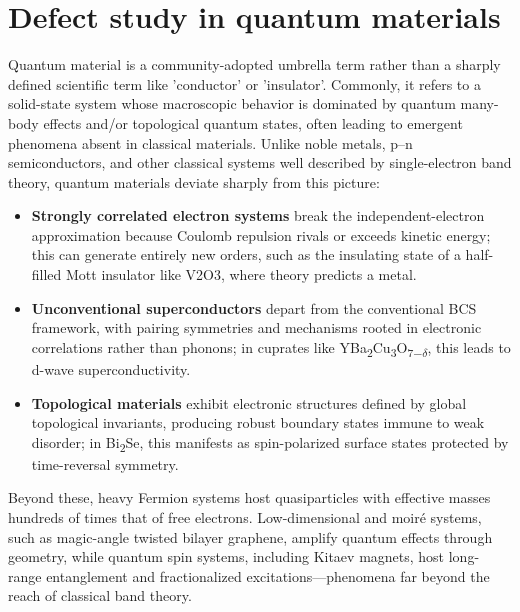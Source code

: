 \section{Defect study in quantum materials}
Quantum material is a community-adopted umbrella term rather than a sharply defined scientific term like 'conductor' or 'insulator'. Commonly, it refers to a solid-state system whose macroscopic behavior is dominated by quantum many-body effects and/or topological quantum states, often leading to emergent phenomena absent in classical materials. Unlike noble metals, p–n semiconductors, and other classical systems well described by single-electron band theory, quantum materials deviate sharply from this picture:
\begin{itemize}
	\item \textbf{Strongly correlated electron systems} break the independent-electron approximation because Coulomb repulsion rivals or exceeds kinetic energy\cite{hubbardElectronCorrelationsNarrow1963}; this can generate entirely new orders, such as the insulating state of a half-filled Mott insulator like V2O3, where theory predicts a metal\cite{mcwhanMottTransitionCrDoped1969}\cite{mottMetalInsulatorTransition1968}\cite{mottMetalInsulatorTransitions1990}.
	\item \textbf{Unconventional superconductors} depart from the conventional BCS framework, with pairing symmetries and mechanisms rooted in electronic correlations rather than phonons\cite{OutShadowBCS2006}; in cuprates like 
	YBa\textsubscript{2}Cu\textsubscript{3}O\textsubscript{7$-\delta$}, this leads to d-wave superconductivity\cite{tsueiPairingSymmetryFlux1994}\cite{hardyPrecisionMeasurementsTemperature1993}\cite{kirtleySymmetryOrderParameter1995}.
	\item \textbf{Topological materials} exhibit electronic structures defined by global topological invariants, producing robust boundary states immune to weak disorder\cite{chiuClassificationTopologicalQuantum2016}; in Bi\textsubscript{2}Se, this manifests as spin-polarized surface states protected by time-reversal symmetry\cite{panElectronicStructureTopological2011}\cite{jozwiakSpinpolarizedSurfaceResonances2016}\cite{sobotaUltrafastElectronDynamics2014}.
\end{itemize}
Beyond these, heavy Fermion systems host quasiparticles with effective masses hundreds of times that of free electrons\cite{wirthExploringHeavyFermions2016}\cite{stewartHeavyfermionSystems1984}. Low-dimensional and moiré systems, such as magic-angle twisted bilayer graphene, amplify quantum effects through geometry\cite{caoUnconventionalSuperconductivityMagicangle2018}\cite{carrTwistronicsManipulatingElectronic2017}, while quantum spin systems, including Kitaev magnets, host long-range entanglement and fractionalized excitations\cite{normanHerbertsmithiteSearchQuantum2016}\cite{banejeeNeutronScatteringProximate2017}—phenomena far beyond the reach of classical band theory.  

